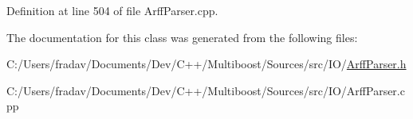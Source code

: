 Definition at line 504 of file Arff\-Parser.\-cpp.



The documentation for this class was generated from the following files\-:\begin{DoxyCompactItemize}
\item 
C\-:/\-Users/fradav/\-Documents/\-Dev/\-C++/\-Multiboost/\-Sources/src/\-I\-O/\hyperlink{ArffParser_8h}{Arff\-Parser.\-h}\item 
C\-:/\-Users/fradav/\-Documents/\-Dev/\-C++/\-Multiboost/\-Sources/src/\-I\-O/Arff\-Parser.\-cpp\end{DoxyCompactItemize}
